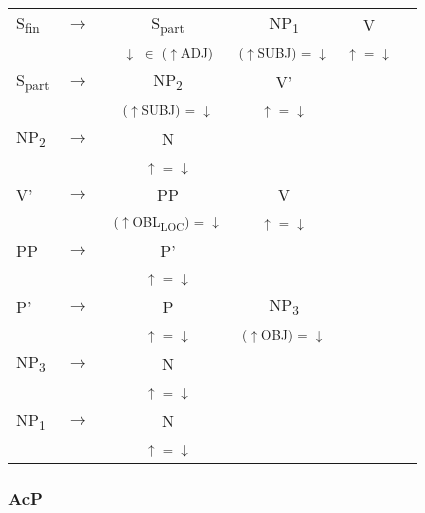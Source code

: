 \documentclass[12pt,a4paper]{article}
\begin{document}
\begin{singlespace}
\begin{tabular}{ l  l  c  c  c  c }
   S\textsubscript{fin} & $\rightarrow$ & S\textsubscript{part} & NP\textsubscript{1} & V\\
   & $\qquad$ & \textsuperscript{ $\downarrow$ $\in$ ($\uparrow$ADJ)} & \textsuperscript{($\uparrow$SUBJ) = $\downarrow$} & \textsuperscript{$\uparrow$ = $\downarrow$} \\
   S\textsubscript{part} & $\rightarrow$ & NP\textsubscript{2} & V'\\
   & \textsuperscript{$\qquad$} & \textsuperscript{($\uparrow$SUBJ) = $\downarrow$} & \textsuperscript{$\uparrow$ = $\downarrow$} \\
   NP\textsubscript{2} & $\rightarrow$ & N \\
   & $\qquad$ & \textsuperscript{$\uparrow$ = $\downarrow$} \\
   V' & $\rightarrow$ & PP & V & \\
   & $\qquad$ & \textsuperscript{($\uparrow$OBL\textsubscript{LOC}) = $\downarrow$ } & \textsuperscript{$\uparrow$ = $\downarrow$} \\
   PP & $\rightarrow$ & P' \\
	& $\qquad$   & \textsuperscript{$\uparrow$ = $\downarrow$} \\
    P' & $\rightarrow$ & P & NP\textsubscript{3} \\
   & $\qquad$ & \textsuperscript{$\uparrow$ = $\downarrow$} & \textsuperscript{($\uparrow$OBJ) = $\downarrow$} \\
    NP\textsubscript{3} & $\rightarrow$ & N \\
   & $\qquad$ & \textsuperscript{$\uparrow$ = $\downarrow$} \\
   NP\textsubscript{1} & $\rightarrow$ & N \\
   & $\qquad$ & \textsuperscript{$\uparrow$ = $\downarrow$} \\
\end{tabular} 
\end{singlespace}

\subsubsection{AcP}


\end{document}
